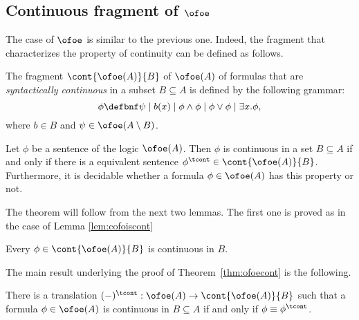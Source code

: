 \subsection{Continuous fragment of $\ofoe$}

The case of $\ofoe$ is similar to the previous one. Indeed, the fragment that characterizes the property of continuity can be 
defined as follows.

\begin{definition}
The fragment $\cont{\ofoe(A)}{B}$ of $\ofoe(A)$ of formulas that are 
\emph{syntactically continuous} in a subset $B \subseteq A$ is 
defined by the following grammar:
\[
\phi \defbnf \psi 
   \mid b(x) 
   \mid \phi \land \phi \mid \phi \lor \phi
   \mid \exists x.\phi,
\]
where $b\in B$ and $\psi \in \ofoe(A\setminus B)$. 
\end{definition}

\begin{theorem}
\label{thm:ofoecont}
Let $\phi$ be a sentence of the  logic $\ofoe(A)$.
Then $\phi$ is continuous in a set $B \subseteq A$ if and only if there is a 
equivalent sentence $\phi^{\tcont} \in \cont{\ofoe(A)}{B}$.
Furthermore, it is decidable whether a formula $\phi \in \ofoe(A)$ has this 
property or not.
\end{theorem}

The theorem will follow from the next two lemmas.
The first one is proved as in the case of Lemma \ref{lem:cofoiscont}

\begin{lemma}\label{lem:cofoeiscont}
Every $\phi \in \cont{\ofoe(A)}{B}$ is continuous in $B$.
\end{lemma}

The main result underlying the proof of Theorem~\ref{thm:ofoecont} is the 
following.

\begin{lemma}
There is a translation $(-)^\tcont:\ofoe(A) \to \cont{\ofoe(A)}{B}$
such that a formula $\phi \in \ofoe(A)$ is continuous in 
$B \subseteq A$ if and only if $\phi\equiv \phi^\tcont$.
\end{lemma}

